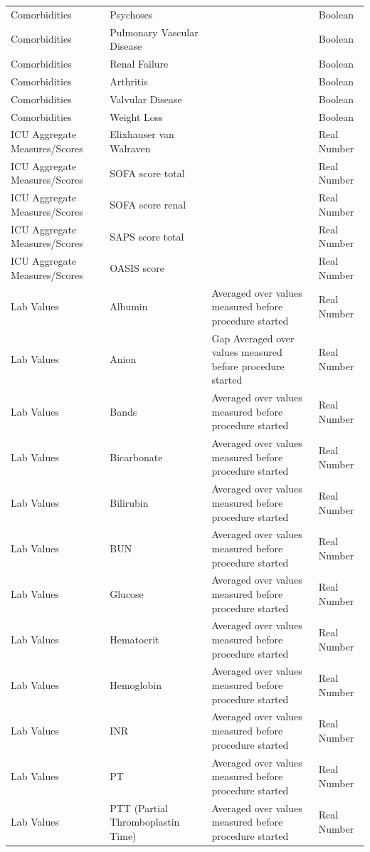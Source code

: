 \documentclass[conference,comsoc]{IEEEtran}
\begin{document}
\begin{longtable}[c]{C{0.2\textwidth} | C{0.2\textwidth} | C{0.4\textwidth} | C{0.2\textwidth}}
Comorbidities & Psychoses & & Boolean \\
Comorbidities & Pulmonary Vascular Disease & & Boolean \\
Comorbidities & Renal Failure & & Boolean \\
Comorbidities & Arthritis & & Boolean \\
Comorbidities & Valvular Disease & & Boolean \\
Comorbidities & Weight Loss & & Boolean \\
ICU Aggregate Measures/Scores & Elixhauser van Walraven & & Real Number \\
ICU Aggregate Measures/Scores & SOFA score total & & Real Number \\
ICU Aggregate Measures/Scores & SOFA score renal & & Real Number \\
ICU Aggregate Measures/Scores & SAPS score total & & Real Number \\
ICU Aggregate Measures/Scores & OASIS score & & Real Number \\
Lab Values & Albumin & Averaged over values measured before procedure started  & Real Number \\
Lab Values & Anion & Gap   Averaged over values measured before procedure started  & Real Number \\
Lab Values & Bands &   Averaged over values measured before procedure started  & Real Number \\
Lab Values & Bicarbonate & Averaged over values measured before procedure started  & Real Number \\
Lab Values & Bilirubin &   Averaged over values measured before procedure started  & Real Number \\
Lab Values & BUN & Averaged over values measured before procedure started  & Real Number \\
Lab Values & Glucose & Averaged over values measured before procedure started  & Real Number \\
Lab Values & Hematocrit &  Averaged over values measured before procedure started  & Real Number \\
Lab Values & Hemoglobin &  Averaged over values measured before procedure started  & Real Number \\
Lab Values & INR & Averaged over values measured before procedure started  & Real Number \\
Lab Values & PT &  Averaged over values measured before procedure started  & Real Number \\
Lab Values & PTT (Partial Thromboplastin Time) & Averaged over values measured before procedure started  & Real Number \\

\end{longtable}
\end{document}
